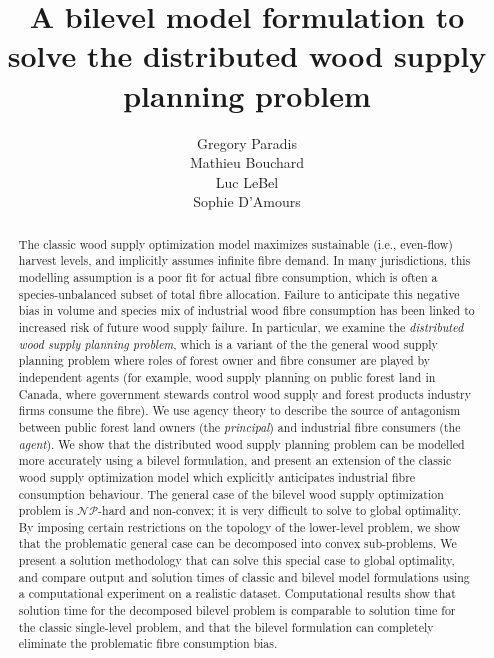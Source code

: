 \documentclass[letterpaper]{article}
\title{A bilevel model formulation to solve the distributed wood supply planning problem}
\author{
  Gregory Paradis\\
  Mathieu Bouchard\\  
  Luc LeBel\\
  Sophie D'Amours
}
\begin{document}
\maketitle

\begin{abstract}
  The classic wood supply optimization model maximizes sustainable (i.e., even-flow) harvest levels, and implicitly assumes infinite fibre demand.
  In many jurisdictions, this modelling assumption is a poor fit for actual fibre consumption, which is often a species-unbalanced subset of total fibre allocation. 
  Failure to anticipate this negative bias in volume and species mix of industrial wood fibre consumption has been linked to increased risk of future wood supply failure.
  In particular, we examine the \emph{distributed wood supply planning problem}, which is a variant of the the general wood supply planning problem where roles of forest owner and fibre consumer are played by independent agents (for example, wood supply planning on public forest land in Canada, where government stewards control wood supply and forest products industry firms consume the fibre).
  We use agency theory to describe the source of antagonism between public forest land owners (the \emph{principal}) and industrial fibre consumers (the \emph{agent}).
  We show that the distributed wood supply planning problem can be modelled more accurately using a bilevel formulation, and present an extension of the classic wood supply optimization model which explicitly anticipates industrial fibre consumption behaviour.
  The general case of the bilevel wood supply optimization problem is $\mathcal{NP}$-hard and non-convex; it is very difficult to solve to global optimality.   
  By imposing certain restrictions on the topology of the lower-level problem, we show that the problematic general case can be decomposed into convex sub-problems.
  We present a solution methodology that can solve this special case to global optimality, and compare output and solution times of classic and bilevel model formulations using a computational experiment on a realistic dataset.
  Computational results show that solution time for the decomposed bilevel problem is comparable to solution time for the classic single-level problem, and that the bilevel formulation can completely eliminate the problematic fibre consumption bias.
\end{abstract}






\end{document}

